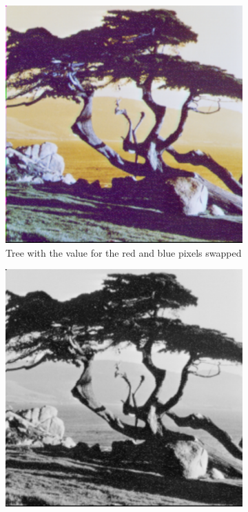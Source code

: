 \documentclass[a4paper,11pt]{article}
\begin{document}
\begin{figure}[h!]
  \begin{center}
    \begin{subfigure}[t]{0.3\textwidth}
      \centering
      \includegraphics[width=0.9\linewidth]{Images/ps0-2-a.png}
      \caption{Tree with the value for the red and blue pixels swapped}
      \label{q2a}
    \end{subfigure}
    \begin{subfigure}[t]{0.3\textwidth}
      \centering
      \includegraphics[width=0.9\linewidth]{Images/ps0-2-b.png}

\end{subfigure}
\end{center}
\end{figure}
\end{document}

